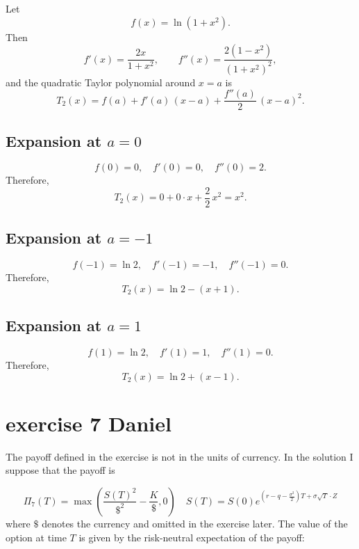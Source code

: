 \documentclass{article}
\begin{document}
Let
\[
    f(x) = \ln(1 + x^2).
\]
Then
\[
    f'(x) = \frac{2x}{1 + x^2},
    \qquad
    f''(x) = \frac{2(1 - x^2)}{(1 + x^2)^2},
\]
and the quadratic Taylor polynomial around \(x = a\) is
\[
    T_2(x) = f(a) + f'(a)\,(x - a) + \frac{f''(a)}{2}\,(x - a)^2.
\]

\subsection*{Expansion at \(a=0\)}

\[
    f(0) = 0,
    \quad
    f'(0) = 0,
    \quad
    f''(0) = 2.
\]
Therefore,
\[
    T_2(x) = 0 + 0\cdot x + \frac{2}{2}\,x^2 = x^2.
\]

\subsection*{Expansion at \(a=-1\)}

\[
    f(-1) = \ln 2,
    \quad
    f'(-1) = -1,
    \quad
    f''(-1) = 0.
\]
Therefore,
\[
    T_2(x) = \ln 2 - (x + 1).
\]

\subsection*{Expansion at \(a=1\)}

\[
    f(1) = \ln 2,
    \quad
    f'(1) = 1,
    \quad
    f''(1) = 0.
\]
Therefore,
\[
    T_2(x) = \ln 2 + (x - 1).
\]


\section{exercise 7 Daniel}
The payoff defined in the exercise is not in the units of currency. In the solution I suppose that the payoff is

\[{{\Pi }_{7}}\left( T \right)=\max \left( \frac{S{{\left( T \right)}^{2}}}{{{\$}^{2}}}-\frac{K}{\$},0 \right)\quad S\left( T \right)=S\left( 0 \right){{e}^{\left( r-q-\frac{{{\sigma }^{2}}}{2} \right)T+\sigma \sqrt{T}\cdot Z}}\]
where $\$$ denotes the currency and omitted in the exercise later. The value of the option at time $T$ is given by the risk-neutral expectation of the payoff:
\end{document}
